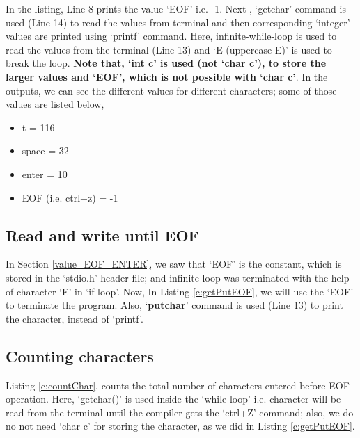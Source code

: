 \begin{explanation}
	In the listing, Line 8 prints the value `EOF' i.e. -1. Next , `getchar' command is used (Line 14) to read the values from terminal and then corresponding `integer' values are printed using `printf' command. Here, infinite-while-loop is used  to read the values from the terminal (Line 13) and `E (uppercase E)' is used to break the loop.  \textbf{Note that, `int c' is used (not `char c'), to store the larger values and `EOF', which is not possible with `char c'}. In the outputs, we can see the different values for different characters; some of those values are listed below, 
\begin{itemize}
	\item t = 116
	\item space = 32
	\item enter = 10
	\item EOF (i.e. ctrl+z) = -1 
\end{itemize}
\end{explanation}



\subsection{Read and write until EOF}
In Section \ref{value_EOF_ENTER}, we saw that `EOF' is the constant, which is stored in the `stdio.h' header file; and infinite loop was terminated with the help of character `E' in `if loop'. Now, In Listing \ref{c:getPutEOF}, we will use the `EOF' to terminate the program. Also, `\textbf{putchar}' command is used (Line 13) to print the character, instead of `printf'. 



\subsection{Counting characters}
Listing \ref{c:countChar}, counts the total number of characters entered before EOF operation. Here, `getchar()' is used inside the `while loop' i.e. character will be read from the terminal until the compiler gets the `ctrl+Z' command; also, we do no not need `char c' for storing the character, as we did in Listing \ref{c:getPutEOF}. 

